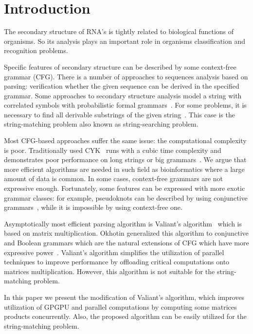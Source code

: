 \section{Introduction}

The secondary structure of RNA's is tightly related to biological functions of organisms.
So its analysis plays an important role in organisms classification and recognition problems.

Specific features of secondary structure can be described by some context-free grammar (CFG).
There is a number of approaches to sequences analysis based on parsing: verification whether the given sequence can be derived in the specified grammar.
Some approaches to secondary structure analysis model a string with correlated symbols with probabilistic formal grammars~\cite{knudsen1999rna, dowell2004evaluation}.
For some problems, it is necessary to find all derivable substrings of the given string~\cite{durbin1996biological}.
This case is the string-matching problem also known as string-searching problem.

Most CFG-based approaches suffer the same issue: the computational complexity is poor.
Traditionally used CYK~\cite{kasami1966efficient, Younger:1966:CLP:1441427.1442019} runs with a cubic time complexity and demonstrates poor performance on long strings or big grammars~\cite{liu2005parallel}.
We argue that more efficient algorithms are needed in such field as bioinformatics where a large amount of data is common.
In some cases, context-free grammars are not expressive enough.
Fortunately, some features can be expressed with more exotic grammar classes:  for example, pseudoknots can be described by using conjunctive grammars~\cite{zier2013rna}, while it is impossible by using context-free one.

Asymptotically most efficient parsing algorithm is Valiant's algorithm~\cite{Valiant:1975:GCR:1739932.1740048} which is based on matrix multiplication.
Okhotin generalized this algorithm to conjunctive and Boolean grammars which are the natural extensions of CFG which have more expressive power~\cite{Okhotin:2014:PMM:2565359.2565379}.
Valiant’s algorithm simplifies the utilization of parallel techniques to improve performance by offloading critical computations onto matrices multiplication.
However, this algorithm is not suitable for the string-matching problem.

In this paper we present the modification of Valiant's algorithm, which improves utilization of GPGPU and parallel computations by computing some matrices products concurrently.
Also, the proposed algorithm can be easily utilized for the string-matching problem.
